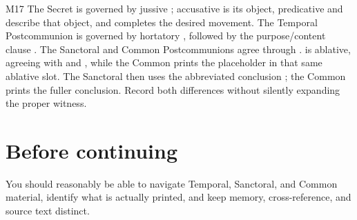 \begin{courseunit}{M17}
The Secret is governed by jussive ; accusative  is
its object, predicative  and  describe that
object, and  completes the desired movement.  The Temporal
Postcommunion is governed by hortatory , followed by the
purpose/content clause .  The Sanctoral and Common
Postcommunions agree through .
 is ablative, agreeing with  and
, while the Common prints the placeholder  in that
same ablative slot.  The Sanctoral then uses the abbreviated conclusion
; the Common prints the fuller conclusion.  Record
both differences without silently expanding the proper witness.
\else
\section{Before continuing}
You should reasonably be able to navigate Temporal, Sanctoral, and Common
material, identify what is actually printed, and keep memory, cross-reference,
and source text distinct.
\fi
\end{courseunit}

